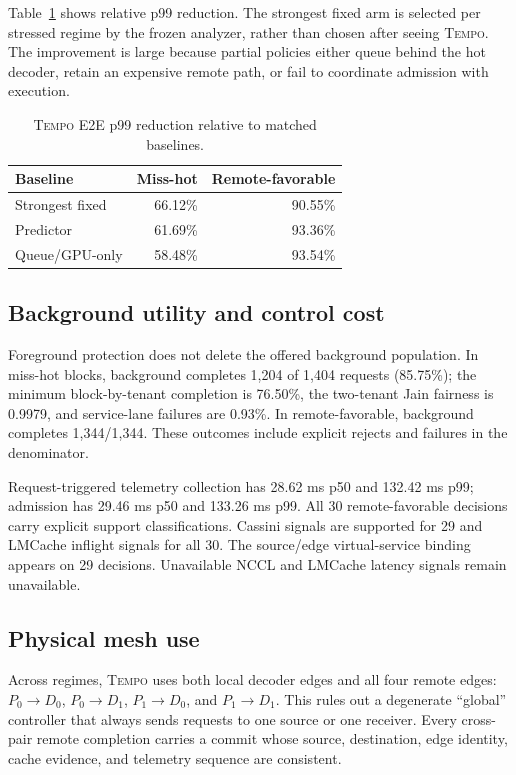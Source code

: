 \documentclass[10pt,twocolumn]{article}
\newcommand{\system}{\textsc{Tempo}\xspace}
\begin{document}
Table~\ref{tab:reductions} shows relative p99 reduction.  The strongest fixed
arm is selected per stressed regime by the frozen analyzer, rather than chosen
after seeing \system.  The improvement is large because partial policies
either queue behind the hot decoder, retain an expensive remote path, or fail
to coordinate admission with execution.

\begin{table}[t]
\centering
\caption{\system E2E p99 reduction relative to matched baselines.}
\label{tab:reductions}
\small
\begin{tabular}{lrr}
\toprule
Baseline & Miss-hot & Remote-favorable \\
\midrule
Strongest fixed & 66.12\% & 90.55\% \\
Predictor & 61.69\% & 93.36\% \\
Queue/GPU-only & 58.48\% & 93.54\% \\
\bottomrule
\end{tabular}
\end{table}

\subsection{Background utility and control cost}

Foreground protection does not delete the offered background population.  In
miss-hot blocks, background completes 1,204 of 1,404 requests (85.75\%); the
minimum block-by-tenant completion is 76.50\%, the two-tenant Jain fairness is
0.9979, and service-lane failures are 0.93\%.  In remote-favorable, background
completes 1,344/1,344.  These outcomes include explicit rejects and failures in
the denominator.

Request-triggered telemetry collection has 28.62 ms p50 and 132.42 ms p99;
admission has 29.46 ms p50 and 133.26 ms p99.  All 30 remote-favorable decisions
carry explicit support classifications.  Cassini signals are supported for 29
and LMCache inflight signals for all 30.  The source/edge virtual-service
binding appears on 29 decisions.  Unavailable NCCL and LMCache latency signals
remain unavailable.

\subsection{Physical mesh use}

Across regimes, \system uses both local decoder edges and all four remote
edges: $P_0\!\rightarrow\!D_0$, $P_0\!\rightarrow\!D_1$,
$P_1\!\rightarrow\!D_0$, and $P_1\!\rightarrow\!D_1$.  This rules out a
degenerate ``global'' controller that always sends requests to one source or
one receiver.  Every cross-pair remote completion carries a commit whose
source, destination, edge identity, cache evidence, and telemetry sequence are
consistent.
\end{document}
